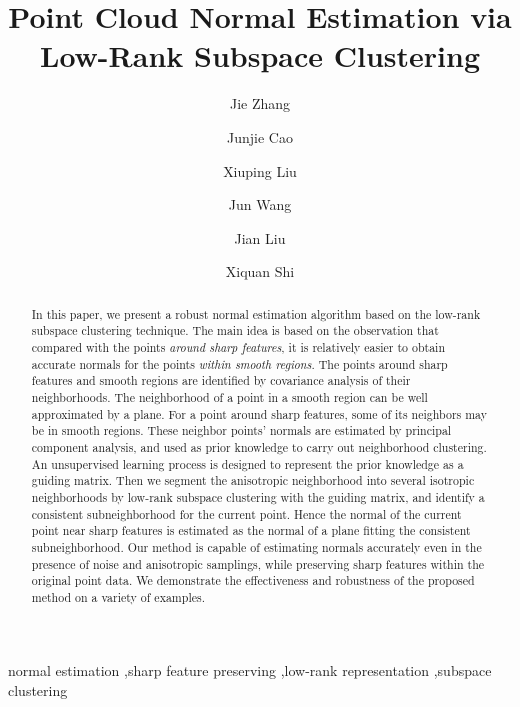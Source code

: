 \documentclass[preprint,5p,times,twocolumn]{elsarticle}
\begin{document}
\begin{frontmatter}

\title{Point Cloud Normal Estimation via Low-Rank Subspace Clustering}
\author[label1]{Jie Zhang}
\author[label1]{Junjie Cao}
\author[label1]{Xiuping Liu}
\author[label2]{Jun Wang}
\author[label1]{Jian Liu}
\author[label3]{Xiquan Shi}
\address[label1]{School of Mathematical Sciences, Dalian University of Technology, China}
\address[label2]{College of Mechanical and Electrical Engineering, Nanjing University of Aeronautics and Astronautics, China}
\address[label3]{Department of Mathematical Sciences, Delaware State University, USA}

\begin{abstract}
In this paper, we present a robust normal estimation algorithm based on the low-rank subspace clustering technique. The main idea is based on the observation that compared with the points \emph{around sharp features}, it is relatively easier to obtain accurate normals for the points \emph{within smooth regions}. The points around sharp features and smooth regions are identified by covariance analysis of their neighborhoods. The neighborhood of a point in a smooth region can be well approximated by a plane. For a point around sharp features, some of its neighbors may be in smooth regions. These neighbor points' normals are estimated by principal component analysis, and used as prior knowledge to carry out neighborhood clustering. An unsupervised learning process is designed to represent the prior knowledge as a guiding matrix. Then we segment the anisotropic neighborhood into several isotropic neighborhoods by low-rank subspace clustering with the guiding matrix, and identify a consistent subneighborhood for the current point. Hence the normal of the current point near sharp features is estimated as the normal of a plane fitting the consistent subneighborhood. Our method is capable of estimating normals accurately even in the presence of noise and anisotropic samplings, while preserving sharp features within the original point data. We demonstrate the effectiveness and robustness of the proposed method on a variety of examples.

\end{abstract}

\begin{keyword}
normal estimation \sep sharp feature preserving \sep low-rank representation \sep subspace clustering
\end{keyword}

\end{frontmatter}
\end{document}
